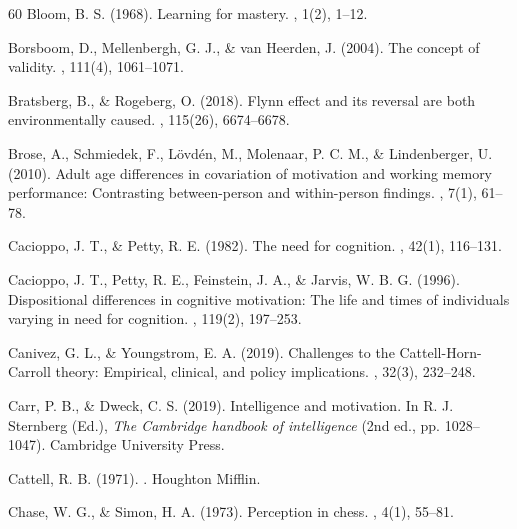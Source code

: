 \documentclass[12pt,a4paper]{article}
\begin{document}
\begin{thebibliography}{60}
Bloom, B. S. (1968).
\newblock Learning for mastery.
, 1(2), 1--12.

Borsboom, D., Mellenbergh, G. J., \& van Heerden, J. (2004).
\newblock The concept of validity.
, 111(4), 1061--1071.

Bratsberg, B., \& Rogeberg, O. (2018).
\newblock Flynn effect and its reversal are both environmentally caused.
, 115(26), 6674--6678.

Brose, A., Schmiedek, F., L\"ovd\'en, M., Molenaar, P. C. M., \& Lindenberger, U. (2010).
\newblock Adult age differences in covariation of motivation and working memory performance: Contrasting between-person and within-person findings.
, 7(1), 61--78.

Cacioppo, J. T., \& Petty, R. E. (1982).
\newblock The need for cognition.
, 42(1), 116--131.

Cacioppo, J. T., Petty, R. E., Feinstein, J. A., \& Jarvis, W. B. G. (1996).
\newblock Dispositional differences in cognitive motivation: The life and times of individuals varying in need for cognition.
, 119(2), 197--253.

Canivez, G. L., \& Youngstrom, E. A. (2019).
\newblock Challenges to the Cattell-Horn-Carroll theory: Empirical, clinical, and policy implications.
, 32(3), 232--248.

Carr, P. B., \& Dweck, C. S. (2019).
\newblock Intelligence and motivation.
\newblock In R. J. Sternberg (Ed.), {\em The Cambridge handbook of intelligence} (2nd ed., pp. 1028--1047). Cambridge University Press.

Cattell, R. B. (1971).
.
\newblock Houghton Mifflin.

Chase, W. G., \& Simon, H. A. (1973).
\newblock Perception in chess.
, 4(1), 55--81.


\end{thebibliography}
\end{document}
